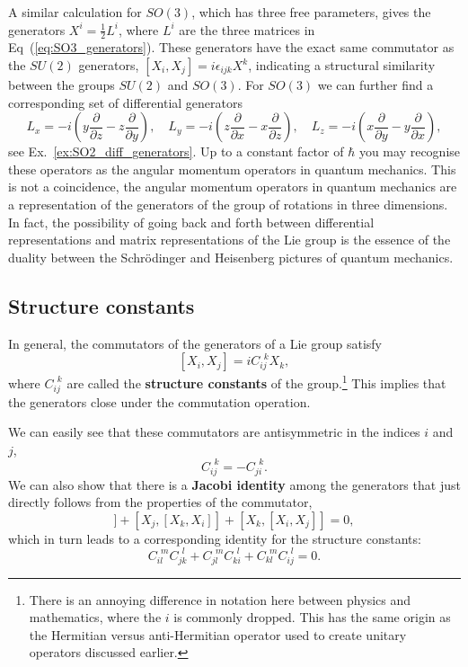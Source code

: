 \documentclass[notes.tex]{subfiles}
\begin{document}
A similar calculation for $SO(3)$, which has three free parameters, gives the generators $X^i=\frac{1}{2}L^i$, where $L^i$ are the three matrices in Eq~(\ref{eq:SO3_generators}). These generators have the exact same commutator as the $SU(2)$ generators, $[X_i,X_j]=i\epsilon_{ijk}X^k$, indicating a structural similarity between the groups $SU(2)$ and $SO(3)$. For $SO(3)$ we can further find a corresponding set of differential generators
\begin{equation}
L_x=-i\left(y\frac{\partial}{\partial z}-z\frac{\partial}{\partial y} \right),\quad
L_y=-i\left(z\frac{\partial}{\partial x}-x\frac{\partial}{\partial z} \right),\quad
L_z=-i\left(x\frac{\partial}{\partial y}-y\frac{\partial}{\partial x} \right),
\label{eq:SO3_diff_generators}
\end{equation}
see Ex.~\ref{ex:SO2_diff_generators}.
Up to a constant factor of $\hbar$ you may recognise these operators as the angular momentum operators in quantum mechanics. This is not a coincidence, the angular momentum operators in quantum mechanics are a representation of the generators of the group of rotations in three dimensions. In fact, the possibility of going back and forth between differential representations and matrix representations of the Lie group is the essence of the duality between the Schr\"odinger and Heisenberg pictures of quantum mechanics.


\subsection{Structure constants}
\label{sec:structure_constants}

In general, the commutators of the generators of a Lie group satisfy \[[X_i,X_j]=iC_{ij}^{~~k}X_k,\] where  $C_{ij}^{~~k}$ are called the {\bf structure constants} of the group.\footnote{There is an annoying difference in notation here between physics and mathematics, where the $i$ is commonly dropped. This has the same origin as the Hermitian versus anti-Hermitian operator used to create unitary operators discussed earlier.} 
This implies that the generators close under the commutation operation.

We can easily see that these commutators are antisymmetric in the indices $i$ and $j$, 
\[C_{ij}^{~~k} = -C_{ji}^{~~k}.\]
We can also show that there is a {\bf Jacobi identity} among the generators that just directly follows from the properties of the commutator,
\begin{equation}
[X_i, [X_j, X_k]] + [X_j, [X_k, X_i]] + [X_k, [X_i, X_j]] = 0,
\label{eq:Jacobi_generators}
\end{equation}
which in turn leads to a corresponding identity for the structure constants:
\begin{equation}
C_{il}^{~~m}C_{jk}^{~~l} + C_{jl}^{~~m}C_{ki}^{~~l} + C_{kl}^{~~m}C_{ij}^{~~l} = 0.
\end{equation}
\end{document}
